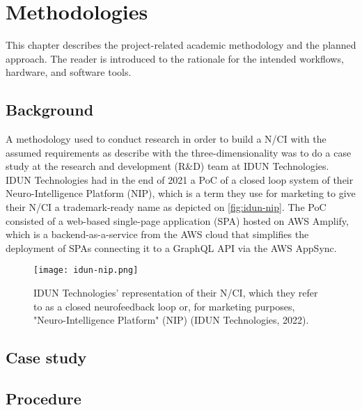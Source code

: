 \chapter{Methodologies}
\graphicspath{{Chapter3/Figs/}{Chapter3/Figs/}}

This chapter describes the project-related academic methodology and the planned approach. The reader is introduced to the rationale for the intended workflows, hardware, and software tools.

\section{Background}
\label{chapter3-background}

A methodology used to conduct research in order to build a N/CI with the assumed requirements as describe with the three-dimensionality was to do a case study at the research and development (R\&D) team at IDUN Technologies. IDUN Technologies had in the end of 2021 a PoC of a closed loop system of their Neuro-Intelligence Platform (NIP), which is a term they use for marketing to give their N/CI a trademark-ready name as depicted on \autoref{fig:idun-nip}. The PoC consisted of a web-based single-page application (SPA) hosted on AWS Amplify, which is a backend-as-a-service from the AWS cloud that simplifies the deployment of SPAs connecting it to a GraphQL API via the AWS AppSync.

\begin{figure}[!ht]
  \centering
  \texttt{[image: idun-nip.png]}
  \caption{IDUN Technologies' representation of their N/CI, which they refer to as a closed neurofeedback loop or, for marketing purposes, "Neuro-Intelligence Platform" (NIP) (IDUN Technologies, 2022).}
  \label{fig:idun-nip}
\end{figure}

\section{Case study}
\label{chapter3-case-study}


\section{Procedure}
\label{chapter3-procedure}

